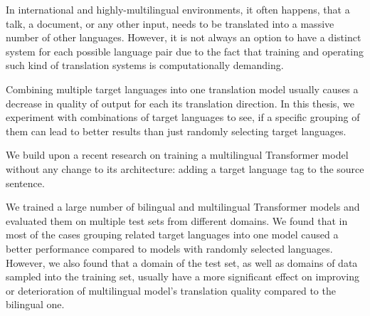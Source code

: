 
In international and highly-multilingual environments,
it often happens, that a talk, a document, or any other
input, needs to be translated into a massive number of other languages.
However, it is not always an option to have a distinct system for each
possible language pair due to the fact that training and operating
such kind of translation systems is computationally demanding.

Combining multiple target languages into one translation model usually
causes a decrease in quality of output for each its translation
direction.
In this thesis, we experiment with combinations of target languages
to see, if a specific grouping of them can lead to better results
than just randomly selecting target languages.

We build upon a recent research on training a multilingual
Transformer model without any change to its architecture:
adding a target language tag to the source sentence.

We trained a large number of bilingual and multilingual
Transformer models and evaluated them on multiple test sets
from different domains.
We found that in most of the cases grouping related
target languages into one model caused a better performance
compared to models with randomly selected languages.
However, we also found that a domain of the test set,
as well as domains of data sampled into the training set,
usually have a more significant effect on improving or
deterioration of multilingual model's translation quality
compared to the bilingual one.
